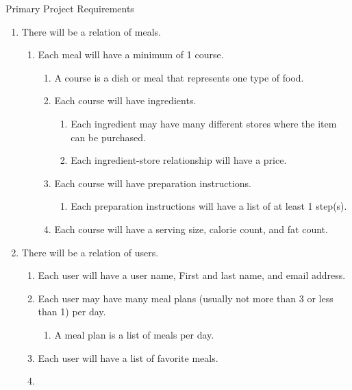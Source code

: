 \documentclass[a4paper,10pt,toc=graduated]{article}
\begin{document}
\begin{mySubsection}{Primary Project Requirements}
\renewcommand{\labelenumi}{\arabic{enumi}. }
\renewcommand{\labelenumii}{\arabic{enumi}.\arabic{enumii}. }
\renewcommand{\labelenumiii}{\arabic{enumi}.\arabic{enumii}.\arabic{enumiii}. }
\renewcommand{\labelenumiv}{\arabic{enumi}.\arabic{enumii}.\arabic{enumiii}. }
\renewcommand{\labelenumiv}{\arabic{enumi}.\arabic{enumii}.\arabic{enumiii}.\arabic{enumiv}. }

\begin{enumerate}
\item
There will be a relation of meals.
\begin{enumerate}
\item
Each meal will have a minimum of 1 course.
\begin{enumerate}
\item
A course is a dish or meal that represents one type of food.
\item
Each course will have ingredients.
\begin{enumerate}
\item
Each ingredient may have many different stores where the item can be purchased.
\item
Each ingredient-store relationship will have a price.
\end{enumerate}
\item
Each course will have preparation instructions.
\begin{enumerate}
\item
Each preparation instructions will have a list of at least 1 step(s).
\end{enumerate}
\item
Each course will have a serving size, calorie count, and fat count.
\end{enumerate}
\end{enumerate}
\item
There will be a relation of users.
\begin{enumerate}
\item
Each user will have a user name, First and last name, and email address.
\item
Each user may have many meal plans (usually not more than 3 or less than 1) per day.
\begin{enumerate}
\item
A meal plan is a list of meals per day.
\end{enumerate}
\item
Each user will have a list of favorite meals.
\item

\end{enumerate}
\end{enumerate}
\end{mySubsection}
\end{document}
